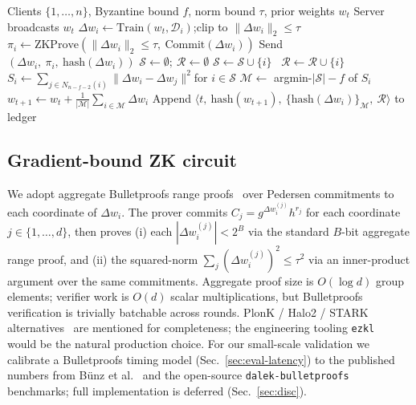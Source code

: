 \documentclass[conference]{IEEEtran}
\begin{document}
\begin{algorithm}[t]
\caption{Multi-Krum + ZK Gradient-Bound Aggregation (one round).}
\label{alg:mkrum}
\begin{algorithmic}[1]
\Require Clients $\{1,\dots,n\}$, Byzantine bound $f$, norm bound $\tau$, prior weights $w_t$
\State Server broadcasts $w_t$
  \State $\Delta w_i \gets \mathrm{Train}(w_t, \mathcal{D}_i)$;\quad clip to $\|\Delta w_i\|_2 \le \tau$
  \State $\pi_i \gets \mathrm{ZKProve}(\|\Delta w_i\|_2 \le \tau,\ \mathrm{Commit}(\Delta w_i))$
  \State Send $(\Delta w_i,\ \pi_i,\ \mathrm{hash}(\Delta w_i))$
\EndFor
\State $\mathcal{S} \gets \emptyset;\ \mathcal{R} \gets \emptyset$
   $\mathcal{S} \gets \mathcal{S} \cup \{i\}$
  \Else\ $\mathcal{R} \gets \mathcal{R} \cup \{i\}$
  \EndIf
\EndFor
\State $S_i \gets \sum_{j\in N_{n-f-2}(i)} \|\Delta w_i - \Delta w_j\|^2$\quad for $i \in \mathcal{S}$
\State $\mathcal{M} \gets$ argmin-$|\mathcal{S}|-f$ of $S_i$
\State $w_{t+1} \gets w_t + \tfrac{1}{|\mathcal{M}|} \sum_{i \in \mathcal{M}} \Delta w_i$
\State Append $\langle t,\ \mathrm{hash}(w_{t+1}),\ \{\mathrm{hash}(\Delta w_i)\}_{\mathcal{M}},\ \mathcal{R}\rangle$ to ledger
\end{algorithmic}
\end{algorithm}

\subsection{Gradient-bound ZK circuit}
We adopt aggregate Bulletproofs range proofs~\cite{bunz2018bulletproofs} over Pedersen commitments to each coordinate of $\Delta w_i$. The prover commits $C_j = g^{\Delta w_i^{(j)}} h^{r_j}$ for each coordinate $j \in \{1,\dots,d\}$, then proves
(i) each $|\Delta w_i^{(j)}| < 2^{B}$ via the standard $B$-bit aggregate range proof, and
(ii) the squared-norm $\sum_j (\Delta w_i^{(j)})^2 \le \tau^2$ via an inner-product argument over the same commitments.
Aggregate proof size is $O(\log d)$ group elements; verifier work is $O(d)$ scalar multiplications, but Bulletproofs verification is trivially batchable across rounds. PlonK / Halo2 / STARK alternatives~\cite{gabizon2019plonk,bowe2019halo,bensasson2018stark} are mentioned for completeness; the engineering tooling \texttt{ezkl}~\cite{kang2022scaling} would be the natural production choice. For our small-scale validation we calibrate a Bulletproofs timing model (Sec.~\ref{sec:eval-latency}) to the published numbers from Bünz et al.~\cite{bunz2018bulletproofs} and the open-source \texttt{dalek-bulletproofs} benchmarks; full implementation is deferred (Sec.~\ref{sec:disc}).
\end{document}
